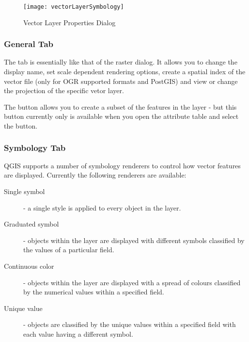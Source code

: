 \begin{figure}[H]
   \begin{center}
   \caption{Vector Layer Properties Dialog}\label{fig:vector_symbology}\smallskip
   \texttt{[image: vectorLayerSymbology]} 
\end{center}  
\end{figure}

\subsubsection{General Tab}
The  tab is essentially like that of the raster dialog. It allows you
to change the display name, set scale dependent rendering options, create a spatial 
index of the vector file (only for OGR supported formats and PostGIS) and view or
change the projection of the specific vetor layer.

The  button allows you to create a subset of the features 
in the layer - but this button currently only is available when you open the 
attribute table and select the  button.

\subsubsection{Symbology Tab}\label{sec:symbology}

QGIS supports a number of symbology renderers to control how
vector features are displayed. Currently the following renderers
are available:

\begin{description} 
    \item[Single symbol] - a single style is applied to every
    object in the layer.
    \item[Graduated symbol] - objects within the layer are
    displayed with different symbols classified by the values of a
    particular field.
    \item[Continuous color] - objects within the layer are
    displayed with a spread of colours classified by the numerical
    values within a specified field.
    \item[Unique value] - objects are classified by the unique
    values within a specified field with each value having a
    different symbol.
\end{description}

